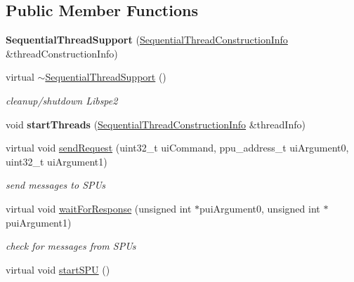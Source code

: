 \subsection*{Public Member Functions}
\begin{DoxyCompactItemize}
\item 
\hypertarget{class_sequential_thread_support_aee73c0902e906141dc87c918f61b51f1}{{\bfseries Sequential\+Thread\+Support} (\hyperlink{struct_sequential_thread_support_1_1_sequential_thread_construction_info}{Sequential\+Thread\+Construction\+Info} \&thread\+Construction\+Info)}\label{class_sequential_thread_support_aee73c0902e906141dc87c918f61b51f1}

\item 
\hypertarget{class_sequential_thread_support_a2214755af73483efa34eb8e901ac9a4d}{virtual \hyperlink{class_sequential_thread_support_a2214755af73483efa34eb8e901ac9a4d}{$\sim$\+Sequential\+Thread\+Support} ()}\label{class_sequential_thread_support_a2214755af73483efa34eb8e901ac9a4d}

\begin{DoxyCompactList}\small\item\em cleanup/shutdown Libspe2 \end{DoxyCompactList}\item 
\hypertarget{class_sequential_thread_support_a4fe5adac8ee34615c275544aef46de4a}{void {\bfseries start\+Threads} (\hyperlink{struct_sequential_thread_support_1_1_sequential_thread_construction_info}{Sequential\+Thread\+Construction\+Info} \&thread\+Info)}\label{class_sequential_thread_support_a4fe5adac8ee34615c275544aef46de4a}

\item 
virtual void \hyperlink{class_sequential_thread_support_ab407174572a6ffe7c00fdbf096dd4f29}{send\+Request} (uint32\+\_\+t ui\+Command, ppu\+\_\+address\+\_\+t ui\+Argument0, uint32\+\_\+t ui\+Argument1)
\begin{DoxyCompactList}\small\item\em send messages to S\+P\+Us \end{DoxyCompactList}\item 
\hypertarget{class_sequential_thread_support_a2db51a427f789c6c489e1250722c7088}{virtual void \hyperlink{class_sequential_thread_support_a2db51a427f789c6c489e1250722c7088}{wait\+For\+Response} (unsigned int $\ast$pui\+Argument0, unsigned int $\ast$pui\+Argument1)}\label{class_sequential_thread_support_a2db51a427f789c6c489e1250722c7088}

\begin{DoxyCompactList}\small\item\em check for messages from S\+P\+Us \end{DoxyCompactList}\item 
\hypertarget{class_sequential_thread_support_aae3626fe6fc67d14c0759712b3a0b5b2}{virtual void \hyperlink{class_sequential_thread_support_aae3626fe6fc67d14c0759712b3a0b5b2}{start\+S\+P\+U} ()}\label{class_sequential_thread_support_aae3626fe6fc67d14c0759712b3a0b5b2}


\end{DoxyCompactItemize}
